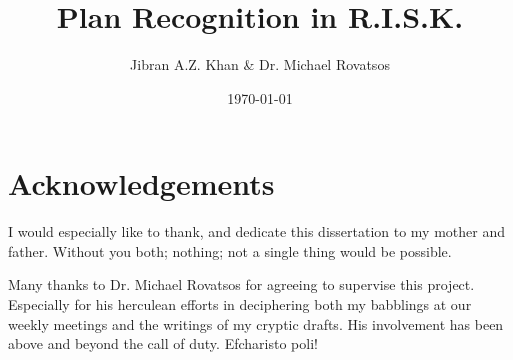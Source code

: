 \documentclass[parskip]{cs4rep}
\begin{document}
\title{Plan Recognition in R.I.S.K.}

\author{Jibran A.Z. Khan \& Dr. Michael Rovatsos}



\date{\today}


\maketitle

\section*{Acknowledgements}

\begin{center}
I would especially like to thank, and dedicate this dissertation to my mother and father. Without you both; nothing; not a single thing would be possible.
\end{center}

\newpage

Many thanks to Dr. Michael Rovatsos for agreeing to supervise this project. Especially for his herculean efforts in deciphering both my babblings at our weekly meetings and the writings of my cryptic drafts. His involvement has been above and beyond the call of duty. Efcharisto poli!
\end{document}
